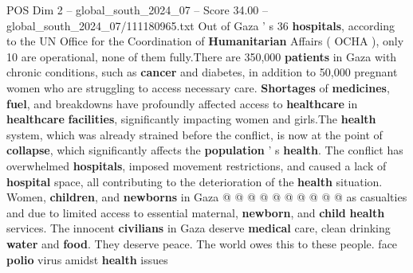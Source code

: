 \begin{textsample}{POS Dim 2 – global\_south\_2024\_07 – Score 34.00 – global\_south\_2024\_07/111180965.txt}
Out of Gaza ' s 36 \textbf{hospitals}, according to the UN Office for the Coordination of \textbf{Humanitarian} Affairs ( OCHA ), only 10 are operational, none of them fully.There are 350,000 \textbf{patients} in Gaza with chronic conditions, such as \textbf{cancer} and diabetes, in addition to 50,000 pregnant women who are struggling to access necessary care. \textbf{Shortages} of \textbf{medicines}, \textbf{fuel}, and breakdowns have profoundly affected access to \textbf{healthcare} in \textbf{healthcare} \textbf{facilities}, significantly impacting women and girls.The \textbf{health} system, which was already strained before the conflict, is now at the point of \textbf{collapse}, which significantly affects the \textbf{population} ' s \textbf{health}.
The conflict has overwhelmed \textbf{hospitals}, imposed movement restrictions, and caused a lack of \textbf{hospital} space, all contributing to the deterioration of the \textbf{health} situation.
Women, \textbf{children}, and \textbf{newborns} in Gaza @ @ @ @ @ @ @ @ @ @ as casualties and due to limited access to essential maternal, \textbf{newborn}, and \textbf{child} \textbf{health} services.
The innocent \textbf{civilians} in Gaza deserve \textbf{medical} care, clean drinking \textbf{water} and \textbf{food}.
They deserve peace.
The world owes this to these people. face \textbf{polio} virus amidst \textbf{health} issues

\end{textsample}
